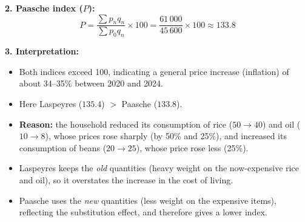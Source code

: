 \documentclass[11pt]{article}
\begin{document}
\begin{exoresolu}
\textbf{2. Paasche index ($P$):}
\[ P = \frac{\sum p_n q_n}{\sum p_0 q_n} \times 100 = \frac{61\,000}{45\,600} \times 100 \approx \mathbf{133.8} \]

\textbf{3. Interpretation:}
\begin{itemize}
    \item Both indices exceed 100, indicating a general price increase (inflation) of about 34--35\% between 2020 and 2024.
    \item Here Laspeyres ($135.4$) $>$ Paasche ($133.8$).
    \item \textbf{Reason:} the household reduced its consumption of rice ($50 \to 40$) and oil ($10 \to 8$), whose prices rose sharply (by 50\% and 25\%), and increased its consumption of beans ($20 \to 25$), whose price rose less (25\%).
    \item Laspeyres keeps the \emph{old} quantities (heavy weight on the now-expensive rice and oil), so it overstates the increase in the cost of living.
    \item Paasche uses the \emph{new} quantities (less weight on the expensive items), reflecting the substitution effect, and therefore gives a lower index.
\end{itemize}
\end{exoresolu}
\end{document}
